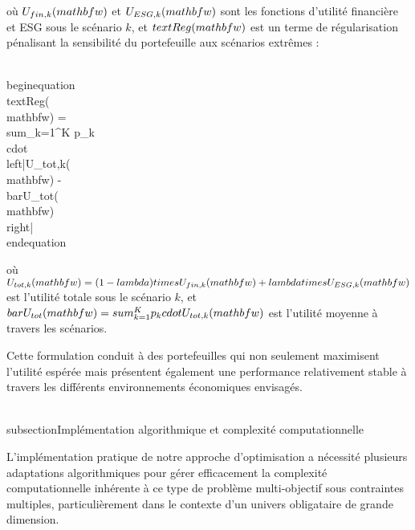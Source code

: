 où $U_{fin,k}(\\mathbf{w})$ et $U_{ESG,k}(\\mathbf{w})$ sont les fonctions d'utilité financière et ESG sous le scénario $k$, et $\\text{Reg}(\\mathbf{w})$ est un terme de régularisation pénalisant la sensibilité du portefeuille aux scénarios extrêmes :

\\begin{equation}
\\text{Reg}(\\mathbf{w}) = \\sum_{k=1}^{K} p_k \\cdot \\left|U_{tot,k}(\\mathbf{w}) - \\bar{U}_{tot}(\\mathbf{w})\\right|
\\end{equation}

où $U_{tot,k}(\\mathbf{w}) = (1-\\lambda) \\times U_{fin,k}(\\mathbf{w}) + \\lambda \\times U_{ESG,k}(\\mathbf{w})$ est l'utilité totale sous le scénario $k$, et $\\bar{U}_{tot}(\\mathbf{w}) = \\sum_{k=1}^{K} p_k \\cdot U_{tot,k}(\\mathbf{w})$ est l'utilité moyenne à travers les scénarios.

Cette formulation conduit à des portefeuilles qui non seulement maximisent l'utilité espérée mais présentent également une performance relativement stable à travers les différents environnements économiques envisagés.

\\subsection{Implémentation algorithmique et complexité computationnelle}

L'implémentation pratique de notre approche d'optimisation a nécessité plusieurs adaptations algorithmiques pour gérer efficacement la complexité computationnelle inhérente à ce type de problème multi-objectif sous contraintes multiples, particulièrement dans le contexte d'un univers obligataire de grande dimension.

